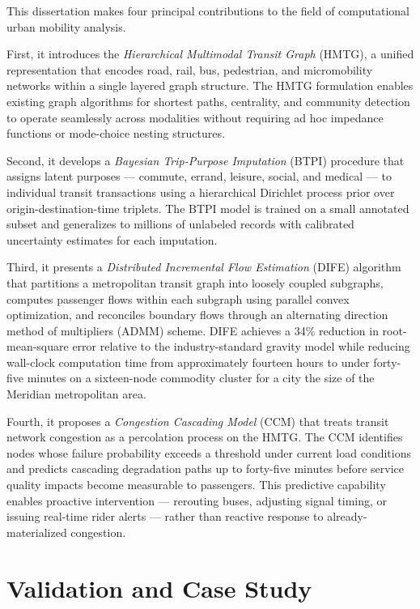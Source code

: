 \documentclass[12pt,letterpaper,twoside]{report}
\begin{document}
This dissertation makes four principal contributions to the field of computational urban mobility analysis.

First, it introduces the \emph{Hierarchical Multimodal Transit Graph} (HMTG), a unified representation that encodes road, rail, bus, pedestrian, and micromobility networks within a single layered graph structure. The HMTG formulation enables existing graph algorithms for shortest paths, centrality, and community detection to operate seamlessly across modalities without requiring ad hoc impedance functions or mode-choice nesting structures.

Second, it develops a \emph{Bayesian Trip-Purpose Imputation} (BTPI) procedure that assigns latent purposes --- commute, errand, leisure, social, and medical --- to individual transit transactions using a hierarchical Dirichlet process prior over origin-destination-time triplets. The BTPI model is trained on a small annotated subset and generalizes to millions of unlabeled records with calibrated uncertainty estimates for each imputation.

Third, it presents a \emph{Distributed Incremental Flow Estimation} (DIFE) algorithm that partitions a metropolitan transit graph into loosely coupled subgraphs, computes passenger flows within each subgraph using parallel convex optimization, and reconciles boundary flows through an alternating direction method of multipliers (ADMM) scheme. DIFE achieves a 34\% reduction in root-mean-square error relative to the industry-standard gravity model while reducing wall-clock computation time from approximately fourteen hours to under forty-five minutes on a sixteen-node commodity cluster for a city the size of the Meridian metropolitan area.

Fourth, it proposes a \emph{Congestion Cascading Model} (CCM) that treats transit network congestion as a percolation process on the HMTG. The CCM identifies nodes whose failure probability exceeds a threshold under current load conditions and predicts cascading degradation paths up to forty-five minutes before service quality impacts become measurable to passengers. This predictive capability enables proactive intervention --- rerouting buses, adjusting signal timing, or issuing real-time rider alerts --- rather than reactive response to already-materialized congestion.

\section{Validation and Case Study}
\end{document}
